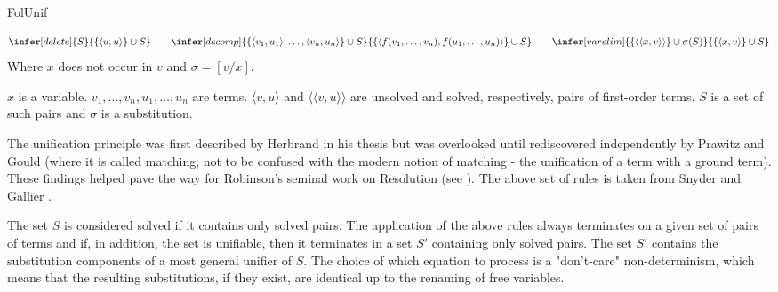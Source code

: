\begin{entry}{FolUnif}

\newcommand{\upair}[2]{\langle#1, #2\rangle}
\newcommand{\spair}[2]{\langle\langle#1, #2\rangle\rangle}

\begin{calculus}
\[
\infer[delete] {S}
               {\{\upair u u\} \cup S}
\qquad
\infer[decomp] {\{\upair {v_1} {u_1} ,\ldots, \upair {v_n} {u_n}\}  \cup S}
               {\{\upair {f(v_1,\ldots,v_n)} {f(u_1,\ldots,u_n)}\} \cup S}
\qquad
\infer[varelim]{\{\spair x v\} \cup \sigma(S)}
               {\{\upair x v\} \cup S}
\]
Where $x$ does not occur in $v$ and $\sigma = [v/x]$.
\end{calculus}

\begin{clarifications}
  $x$ is a variable. $v_1,\ldots,v_n, u_1,\ldots, u_n$ are terms.
  $\upair v u$ and $\spair v u$ are unsolved and solved, respectively, pairs of first-order terms.
  $S$ is a set of such pairs and $\sigma$ is a substitution.
\end{clarifications}

\begin{history}
   The unification principle was first described by Herbrand in his thesis \cite{herbrand1930recherches}
   but was overlooked until rediscovered independently by Prawitz \cite{Prawitz1960}
   and Gould \cite{guard1964automated} (where it is called matching, not to
   be confused with the modern notion of matching - the unification of a term
   with a ground term).
   These findings helped pave the way for Robinson's seminal work on Resolution \cite{Robinson1965JACM} (see ).
   The above set of rules is taken from Snyder and Gallier \cite{Snyder1989101}.
\end{history}

\begin{technicalities}
   The set $S$ is considered
   solved if it contains only solved pairs. The application of the above rules always terminates on a given set of pairs of terms
   and if, in addition, the set is unifiable, then it terminates in a set $S'$ containing only solved pairs.
   The set $S'$ contains the substitution components \cite{Robinson1965JACM} of a most general unifier of $S$.
   The choice of which equation to process is a "don't-care" non-determinism, which means
   that the resulting substitutions, if they exist, are identical up to the renaming of free variables.
 \end{technicalities}


\end{entry}
